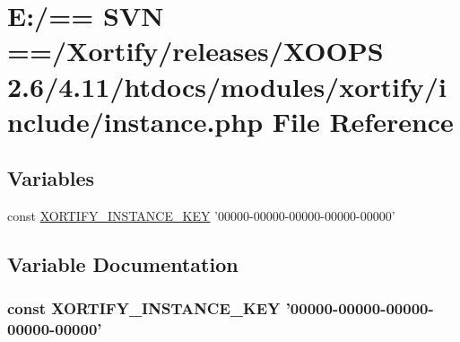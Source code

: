 \hypertarget{instance_8php}{\section{E\-:/== S\-V\-N ==/\-Xortify/releases/\-X\-O\-O\-P\-S 2.6/4.11/htdocs/modules/xortify/include/instance.php File Reference}
\label{instance_8php}
}
\subsection*{Variables}
\begin{DoxyCompactItemize}
\item 
const \hyperlink{instance_8php_ad4a865d4289ea8a5a0454b65e7ea47c7}{X\-O\-R\-T\-I\-F\-Y\-\_\-\-I\-N\-S\-T\-A\-N\-C\-E\-\_\-\-K\-E\-Y} '00000-\/00000-\/00000-\/00000-\/00000'
\end{DoxyCompactItemize}


\subsection{Variable Documentation}
\hypertarget{instance_8php_ad4a865d4289ea8a5a0454b65e7ea47c7}{
\subsubsection[{X\-O\-R\-T\-I\-F\-Y\-\_\-\-I\-N\-S\-T\-A\-N\-C\-E\-\_\-\-K\-E\-Y}]{\setlength{\rightskip}{0pt plus 5cm}const X\-O\-R\-T\-I\-F\-Y\-\_\-\-I\-N\-S\-T\-A\-N\-C\-E\-\_\-\-K\-E\-Y '00000-\/00000-\/00000-\/00000-\/00000'}}\label{instance_8php_ad4a865d4289ea8a5a0454b65e7ea47c7}
